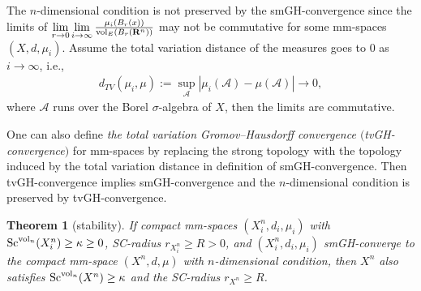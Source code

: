 \documentclass[pdftex]{sigma}
\newtheorem{Theorem}{Theorem}[section]
\begin{document}
\begin{Remark}
The $n$-dimensional condition is not preserved by the smGH-convergence since the limits of $\lim\limits_{r \to 0}\lim\limits_{i \to \infty}\frac{\mu_i(B_r(x))}{{\rm vol}_E(B_r(\mathbf{R}^n))}$ may not be commutative for some mm-spaces $(X, d, \mu_i)$. Assume the total variation distance of the measures goes to 0 as $i \to \infty$, i.e.,
\begin{gather*}
d_{TV}(\mu_i, \mu):=\sup\limits_{\mathcal{A}}|\mu_i(\mathcal{A})-\mu(\mathcal{A})|\to 0,
\end{gather*}
where $\mathcal{A}$ runs over the Borel $\sigma$-algebra of $X$, then the limits are commutative.
\end{Remark}

One can also define \textit{the total variation Gromov--Hausdorff convergence $($tvGH-convergence$)$} for mm-spaces by replacing the strong topology with the topology induced by the total variation distance in definition of smGH-convergence. Then tvGH-convergence implies smGH-convergence and the $n$-dimensional condition is preserved by tvGH-convergence.

\begin{Theorem}[stability]
If compact mm-spaces $(X_i^n, d_i, \mu_i)$ with ${\rm Sc}^{{\rm vol}_n}(X^n_i)\geq \kappa\geq 0$, SC-radius $r_{X^n_i}\geq R>0$, and $(X_i^n, d_i, \mu_i)$ smGH-converge to the compact mm-space $(X^n, d, \mu)$ with $n$-dimensional condition, then $X^n$ also satisfies ${\rm Sc}^{{\rm vol}_n}(X^n)\geq \kappa$ and the SC-radius $r_{X^n}\geq R$.
\end{Theorem}
\end{document}
